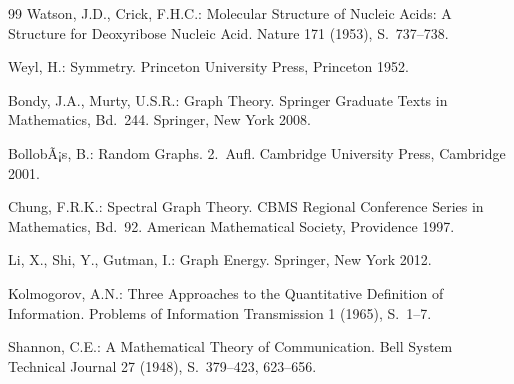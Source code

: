 ﻿\documentclass[a4paper,12pt]{article}
\theoremstyle{definition}
\begin{document}
\begin{thebibliography}{99}
Watson, J.D., Crick, F.H.C.:
Molecular Structure of Nucleic Acids: A Structure for Deoxyribose Nucleic Acid.
Nature 171 (1953), S.~737--738.

Weyl, H.:
Symmetry.
Princeton University Press, Princeton 1952.


Bondy, J.A., Murty, U.S.R.:
Graph Theory. Springer Graduate Texts in Mathematics, Bd.~244.
Springer, New York 2008.

BollobÃ¡s, B.:
Random Graphs. 2.~Aufl.
Cambridge University Press, Cambridge 2001.

Chung, F.R.K.:
Spectral Graph Theory. CBMS Regional Conference Series in Mathematics, Bd.~92.
American Mathematical Society, Providence 1997.

Li, X., Shi, Y., Gutman, I.:
Graph Energy.
Springer, New York 2012.

Kolmogorov, A.N.:
Three Approaches to the Quantitative Definition of Information.
Problems of Information Transmission 1 (1965), S.~1--7.

Shannon, C.E.:
A Mathematical Theory of Communication.
Bell System Technical Journal 27 (1948), S.~379--423, 623--656.

\end{thebibliography}
\end{document}
